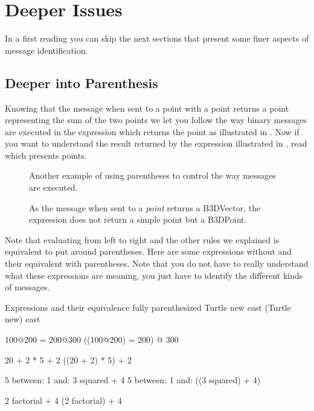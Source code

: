 \documentclass[a4paper,10pt,twoside]{book}
\begin{document}
	\renewcommand{\nnbb}[2]{} %
	\sloppy
\fi

\section{Deeper Issues}
In a first reading you can skip the next sections that present some finer aspects of message identification.

\subsection{Deeper into Parenthesis}
Knowing that the message \ct{+} when sent to a point with a point returns a point representing the sum of the two points we let you follow the way binary messages are executed in the expression  which returns the point  as illustrated in . Now if you want to understand the result returned by the expression  illustrated in , read  which presents points.


\begin{figure}[ht]
\caption{Another example of using parentheses to control the way messages are executed.\label{fig:compoBinBracket}}
\end{figure}

\begin{figure}[ht]
\caption{As the message  when sent to a \textit{point} returns a B3DVector, the expression does not return a simple point but a B3DPoint.  \label{fig:compoBinNoBracket}}
\end{figure}




Note that evaluating from left to right and the other rules we explained is equivalent to put around parentheses. Here are some expressions without and their equivalent with parentheses. Note that you do not have to really understand what these expressions are meaning, you just have to identify the different kinds of messages.

\begin{script}{Expressions and their equivalence fully parenthesized}
Turtle new east
    (Turtle new) east

100@200 = 200@300
	((100@200) = 200) @ 300

20 + 2 * 5 + 2
   ((20 + 2) * 5) + 2

5 between: 1 and: 3 squared + 4
   5 between: 1 and: ((3 squared) + 4)

2 factorial + 4
    (2 factorial) + 4
\end{script}
\end{document}
